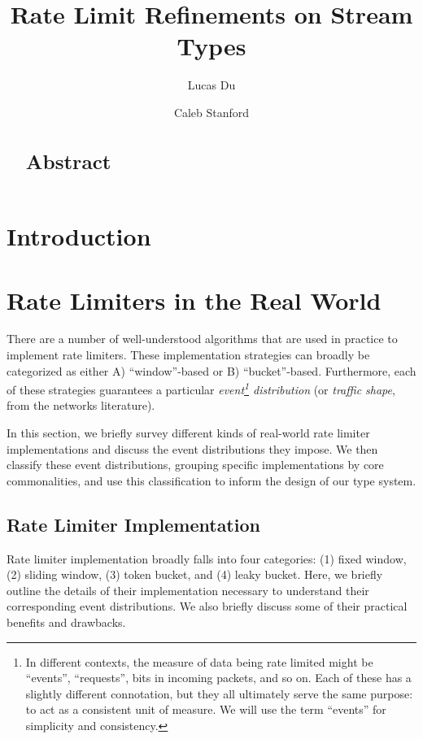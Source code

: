 \documentclass[acmsmall,nonacm,screen]{acmart}
\title{Rate Limit Refinements on Stream Types}
\author{Lucas Du}
\affiliation{
  \institution{University of California, Davis}
  \country{USA}
}
\author{Caleb Stanford}
\affiliation{
  \institution{University of California, Davis}
  \country{USA}
}
\begin{document}
\begin{abstract}
  \section*{Abstract}
\end{abstract}

\maketitle

\section{Introduction}

\section{Rate Limiters in the Real World}
There are a number of well-understood algorithms that are used in practice to implement rate limiters. These implementation strategies can broadly be categorized as either A) ``window''-based or B) ``bucket''-based. Furthermore, each of these strategies guarantees a particular \textit{event\footnote{In different contexts, the measure of data being rate limited might be ``events'', ``requests'', bits in incoming packets, and so on. Each of these has a slightly different connotation, but they all ultimately serve the same purpose: to act as a consistent unit of measure. We will use the term ``events'' for simplicity and consistency.} distribution} (or \textit{traffic shape}, from the networks literature).

In this section, we briefly survey different kinds of real-world rate limiter implementations and discuss the event distributions they impose. We then classify these event distributions, grouping specific implementations by core commonalities, and use this classification to inform the design of our type system.

\subsection{Rate Limiter Implementation}
Rate limiter implementation broadly falls into four categories: (1) fixed window, (2) sliding window, (3) token bucket, and (4) leaky bucket. Here, we briefly outline the details of their implementation necessary to understand their corresponding event distributions. We also briefly discuss some of their practical benefits and drawbacks.
\end{document}
